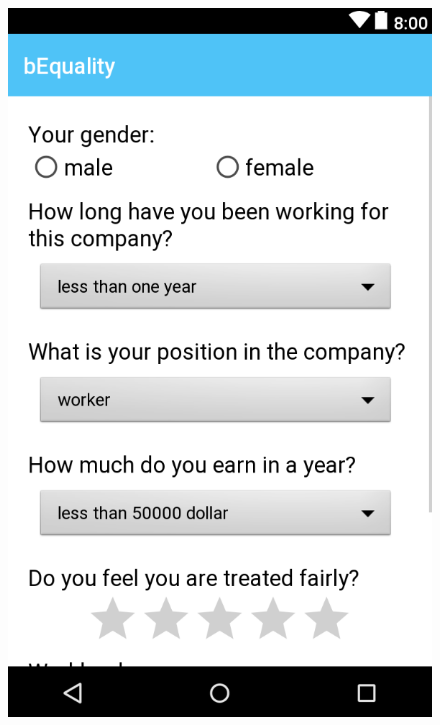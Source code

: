 \documentclass[portrait,a4paper]{article}
\begin{document}
\begin{figure}[!htb]
			\endminipage\hfill
  				\includegraphics[width=\linewidth]{Bilder/App_2_Survey_1}
  			

\end{figure}
\end{document}
